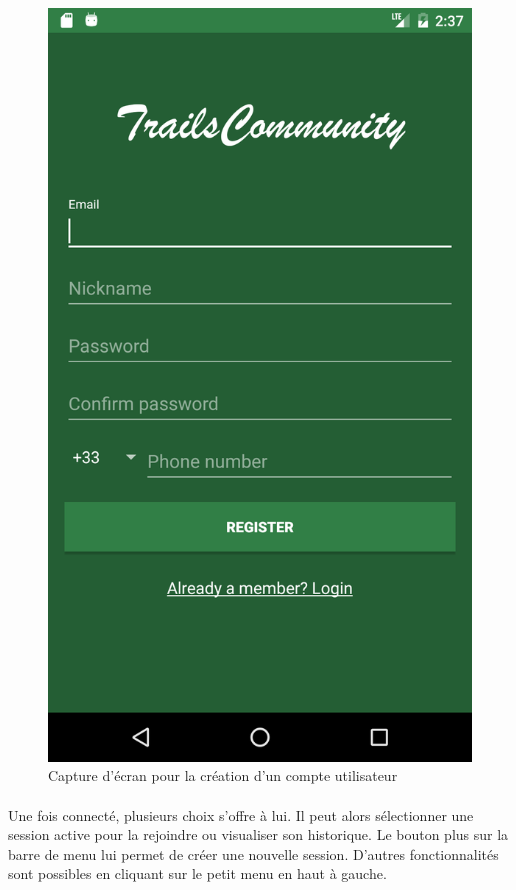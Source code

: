 \documentclass[titlepage, 12pt]{report}
\begin{document}
\begin{figure}[!h]
	\caption{Capture d'écran pour la création d'un compte utilisateur}
	\label{screenshots_register}
	\centering
	\includegraphics[scale=0.2]{Images/screenshots/register.png}
\end{figure}

\clearpage

\paragraph{}Une fois connecté, plusieurs choix s'offre à lui. Il peut alors sélectionner une session active pour la rejoindre ou visualiser son historique. Le bouton plus sur la barre de menu lui permet de créer une nouvelle session. D'autres fonctionnalités sont possibles en cliquant sur le petit menu en haut à gauche.
\end{document}
